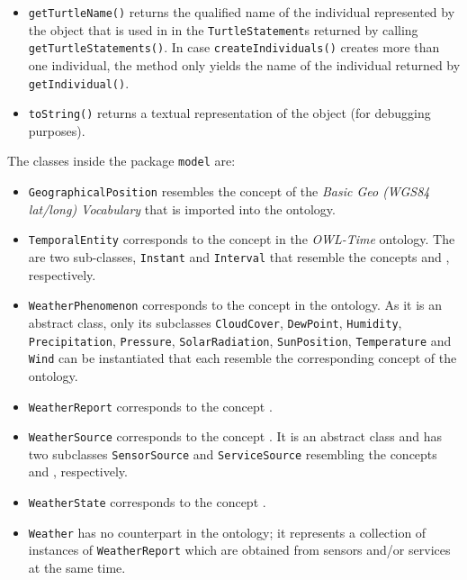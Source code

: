 \begin{itemize}
  \item \texttt{getTurtleName()} returns the qualified name of the individual represented by the object that is used in in the \texttt{TurtleStatement}s returned by calling \texttt{getTurtleStatements()}. In case \texttt{createIndividuals()} creates more than one individual, the method only yields the name of the individual returned by \texttt{getIndividual()}.
  
  \item \texttt{toString()} returns a textual representation of the object (for debugging purposes).
\end{itemize}

The classes inside the package \texttt{model} are:
\begin{itemize}
  \item \texttt{GeographicalPosition} resembles the concept  of the \emph{Basic Geo (WGS84 lat/long) Vocabulary}\cite{wgs84_vocabulary} that is imported into the \smarthomeweather ontology.
  
  \item \texttt{TemporalEntity} corresponds to the concept  in the \emph{OWL-Time}\cite{owl-time} ontology. The are two sub-classes, \texttt{Instant} and \texttt{Interval} that resemble the concepts  and , respectively.
  
  \item \texttt{WeatherPhenomenon} corresponds to the concept  in the \smarthomeweather ontology. As it is an abstract class, only its subclasses \texttt{CloudCover}, \texttt{DewPoint}, \texttt{Humidity}, \texttt{Precipitation}, \texttt{Pressure}, \texttt{SolarRadiation}, \texttt{SunPosition}, \texttt{Temperature} and \texttt{Wind} can be instantiated that each resemble the corresponding concept of the ontology.
  
  \item \texttt{WeatherReport} corresponds to the concept .
  
  \item \texttt{WeatherSource} corresponds to the concept . It is an abstract class and has two subclasses \texttt{SensorSource} and \texttt{ServiceSource} resembling the concepts  and , respectively.
  
  \item \texttt{WeatherState} corresponds to the concept .
  
  \item \texttt{Weather} has no counterpart in the ontology; it represents a collection of instances of \texttt{WeatherReport} which are obtained from sensors and/or services at the same time.
\end{itemize}

